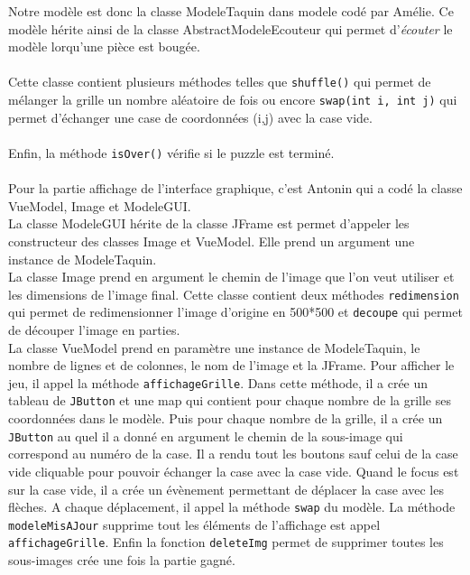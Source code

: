 \documentclass[french,12pt]{article}
\begin{document}
Notre modèle est donc la classe \textsf{ModeleTaquin} dans \textsf{modele} codé par Amélie. Ce modèle hérite ainsi de la classe \textsf{AbstractModeleEcouteur} qui permet d'\textit{écouter} le modèle lorqu'une pièce est bougée.
\\\\
Cette classe contient plusieurs méthodes telles que \texttt{shuffle()} qui permet de mélanger la grille un nombre aléatoire de fois ou encore \texttt{swap(int i, int j)} qui permet d'échanger une case de coordonnées (i,j) avec la case vide. 
\\\\
Enfin, la méthode \texttt{isOver()} vérifie si le puzzle est terminé.
\\\\
Pour la partie affichage de l'interface graphique, c'est Antonin qui a codé la classe \textsf{VueModel}, \textsf{Image} et \textsf{ModeleGUI}. 
\\
La classe \textsf{ModeleGUI} hérite de la classe \textsf{JFrame} est permet d'appeler les constructeur des classes \textsf{Image} et \textsf{VueModel}. Elle prend un argument une instance de \textsf{ModeleTaquin}. 
\\
La classe \textsf{Image} prend en argument le chemin de l'image que l'on veut utiliser et les dimensions de l'image final. Cette classe contient deux méthodes \texttt{redimension} qui permet de redimensionner l'image d'origine en 500*500 et \texttt{decoupe} qui permet de découper l'image en parties. 
\\
La classe {VueModel} prend en paramètre une instance de \textsf{ModeleTaquin}, le nombre de lignes et de colonnes, le nom de l'image et la JFrame. Pour afficher le jeu, il appel la méthode \texttt{affichageGrille}. Dans cette méthode, il a crée un tableau de \texttt{JButton} et une map qui contient pour chaque nombre de la grille ses coordonnées dans le modèle. Puis pour chaque nombre de la grille, il a crée un \texttt{JButton} au quel il a donné en argument le chemin de la sous-image qui correspond au numéro de la case.
Il a rendu tout les boutons sauf celui de la case vide cliquable pour pouvoir échanger la case avec la case vide. Quand le focus est sur la case vide, il a crée un évènement permettant de déplacer la case avec les flèches. A chaque déplacement, il appel la méthode \texttt{swap} du modèle. La méthode \texttt{modeleMisAJour} supprime tout les éléments de l'affichage est appel \texttt{affichageGrille}. Enfin la fonction \texttt{deleteImg} permet de supprimer toutes les sous-images crée une fois la partie gagné.
\end{document}
